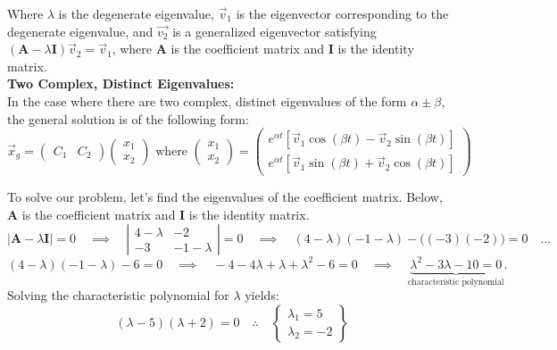 \documentclass[a4paper,12pt]{article}
\begin{document}
Where $\lambda$ is the degenerate eigenvalue, $\vec{v}_1$ is the eigenvector corresponding to the degenerate eigenvalue, and $\vec{v_2}$ is a generalized eigenvector satisfying $(\mathbf{A} - \lambda \mathbf{I})\vec{v}_2 = \vec{v}_1$, where $\mathbf{A}$ is the coefficient matrix and $\mathbf{I}$ is the identity matrix.\\

\textbf{Two Complex, Distinct Eigenvalues:}\\
In the case where there are two complex, distinct eigenvalues of the form $\alpha \pm \beta$, the general solution is of the following form:
$$ \vec{x}_g = \left(\begin{matrix}
	C_1 & C_2
\end{matrix}\right)\left(\begin{matrix}
	x_1 \\
	x_2
\end{matrix}\right) \text{ where } \left(\begin{matrix}
	x_1 \\
	x_2
\end{matrix}\right) = \left(\begin{matrix}e^{\alpha t}[\vec{v}_1\cos{(\beta t)} - \vec{v}_2\sin{(\beta t)}] \\
e^{\alpha t}[ \vec{v}_1\sin{(\beta t)} + \vec{v}_2\cos{(\beta t)}]\end{matrix}\right)$$

To solve our problem, let's find the eigenvalues of the coefficient matrix. Below, $\mathbf{A}$ is the coefficient matrix and $\mathbf{I}$ is the identity matrix.
$$ |\mathbf{A} - \lambda \mathbf{I}| = 0 \quad\implies\quad \left|\begin{matrix}
	4-\lambda & -2 \\
	-3 & -1-\lambda
\end{matrix}\right| = 0 \quad\implies\quad (4-\lambda)(-1-\lambda) - \big((-3)(-2)\big) = 0 \quad\ldots$$
$$ (4-\lambda)(-1-\lambda) - 6 = 0 \quad\implies\quad -4-4\lambda + \lambda + \lambda^2 - 6 = 0 \quad\implies\quad \underbrace{\lambda^2 -3\lambda -10 = 0}_{\text{characteristic polynomial}}. $$
Solving the characteristic polynomial for $\lambda$ yields:
$$ (\lambda -5)(\lambda+2)=0 \quad\therefore\quad \boxed{\left\{\begin{matrix}
	\lambda_1 = 5\\
	\lambda_2 = -2
\end{matrix}\right\}} $$
\end{document}
